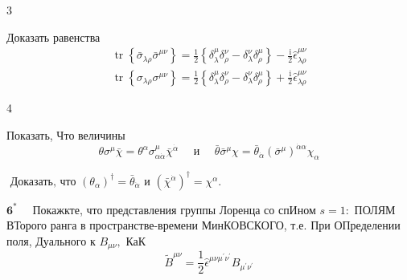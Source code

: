\documentclass[a4paper,12pt]{article} %
\begin{document}
\begin{task}

3

Доказать равенства
$$
\begin{array}{l}
\operatorname{tr}\left\{\bar{\sigma}_{\lambda \rho} \bar{\sigma}^{\mu \nu}\right\}=\frac{1}{2}\left\{\delta_{\lambda}^{\mu} \delta_{\rho}^{\nu}-\delta_{\lambda}^{\nu} \delta_{\rho}^{\mu}\right\}-\frac{\mathrm{i}}{2} \hat{\epsilon}_{\lambda \rho}^{\mu \nu} \\
\operatorname{tr}\left\{\sigma_{\lambda \rho} \sigma^{\mu \nu}\right\}=\frac{1}{2}\left\{\delta_{\lambda}^{\mu} \delta_{\rho}^{\nu}-\delta_{\lambda}^{\nu} \delta_{\rho}^{\mu}\right\}+\frac{\mathrm{i}}{2} \hat{\epsilon}_{\lambda \rho}^{\mu \nu}
\end{array}
$$


\end{task}



\begin{task}

4

Показать, Что величины
$$
\theta \sigma^{\mu} \bar{\chi}=\theta^{\alpha} \sigma_{\alpha \dot{\alpha}}^{\mu} \bar{\chi}^{\dot{\alpha}} \quad \text { и } \quad \bar{\theta} \bar{\sigma}^{\mu} \chi=\bar{\theta}_{\dot{\alpha}}\left(\bar{\sigma}^{\mu}\right)^{\dot{\alpha} \alpha} \chi_{\alpha}
$$


\end{task}



\begin{task}
$\text { Доказать, что }\left(\theta_{\alpha}\right)^{\dagger}=\bar{\theta}_{\dot{\alpha}} \text { и }\left(\bar{\chi}^{\dot{\alpha}}\right)^{\dagger}=\chi^{\alpha}$.



\end{task}



\begin{task}

$\mathbf{6}^{*} \quad$ Покажкте, что представления группы Лоренца со спИном $s=1:$
ПОЛЯМ ВТорого ранга в пространстве-времени МинКОВСКОГО, т.е. При ОПределении поля, Дуального к $B_{\mu \nu},$ КаК
$$
\tilde{B}^{\mu \nu}=\frac{1}{2} \hat{\epsilon}^{\mu \nu \mu^{\prime} \nu^{\prime}} B_{\mu^{\prime} \nu^{\prime}}
$$


\end{task}
\end{document}
